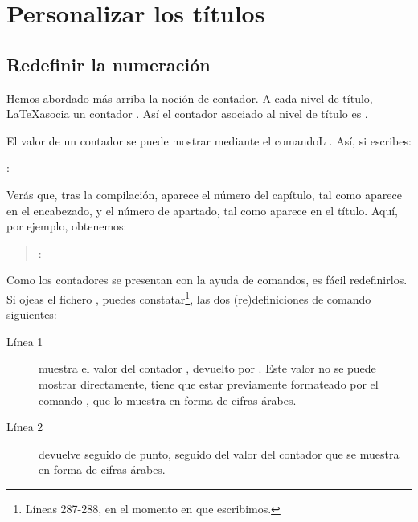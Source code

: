 \section{Personalizar los títulos}

\subsection{Redefinir la numeración}\label{apparencecompteur}
Hemos abordado más arriba la noción de contador. A cada nivel de título, \LaTeX asocia un contador . Así el contador asociado al nivel de título  es .

El valor de un contador se puede mostrar mediante el comandoL . Así, si escribes:
 
\begin{latexcode}
\thechapter : \thesection
\end{latexcode}

Verás que, tras la compilación, aparece el número del capítulo, tal como aparece en el encabezado, y el número de apartado, tal como aparece en el título. Aquí, por ejemplo, obtenemos:


\begin{quotation}
\thechapter : \thesection
\end{quotation}

Como los contadores se presentan con la ayuda de comandos, es fácil redefinirlos. Si ojeas el fichero , puedes constatar\footnote{Líneas 287-288, en el momento en que escribimos.}, las dos (re)definiciones de comando siguientes:

\begin{latexcode}
\renewcommand \thechapter {\@arabic\c@chapter}
\renewcommand \thesection {\thechapter.\@arabic\c@section}
\end{latexcode}

\begin{description}
\item[Línea 1] muestra el valor del contador , devuelto por . Este valor no se puede mostrar directamente, tiene que estar previamente formateado por el comando , que lo muestra en forma de cifras árabes.
\item[Línea 2] devuelve  seguido de punto, seguido del valor del contador  que se muestra en forma de cifras árabes.
\end{description}

